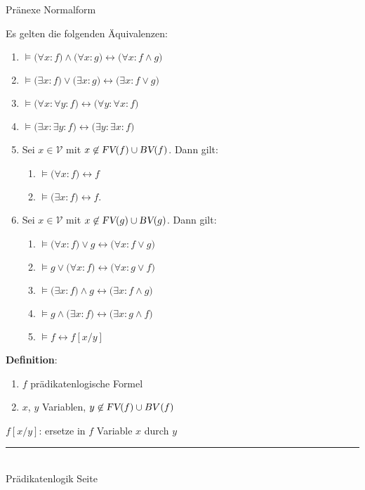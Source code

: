 \documentclass{slides}
\newcommand{\myrule}{\rule{20cm}{1mm}\\ }
\newcommand{\FV}{\textsl{FV}}
\newcommand{\BV}{\textsl{BV}}
\newcounter{mypage}
\begin{document}

\begin{slide}{}
\normalsize
\begin{center}
Pränexe Normalform
\end{center}
\vspace{0.5cm}

\footnotesize
Es gelten die folgenden Äquivalenzen:
  \begin{enumerate}
  \item $\models \big(\forall x\colon f\big) \wedge \big(\forall x\colon g\big) \leftrightarrow \big(\forall x\colon f \wedge g\big)$
  \item $\models \big(\exists x\colon f\big) \vee \big(\exists x\colon g\big) \leftrightarrow \big(\exists x\colon f \vee g\big)$
  \item $\models \big(\forall x\colon \forall y\colon f \big) \leftrightarrow \big(\forall y\colon  \forall x\colon f \big)$
  \item $\models \big(\exists x\colon \exists y\colon f \big) \leftrightarrow \big(\exists y\colon  \exists x\colon f \big)$
  \item Sei $x \in \mathcal{V}$ mit $x \not\in \FV(f) \cup \BV(f)$. Dann gilt:
    \begin{enumerate}
    \item $\models  \big(\forall x\colon f) \leftrightarrow f$ 
    \item $\models  \big(\exists x\colon f) \leftrightarrow f$.
    \end{enumerate}
  \item Sei $x \in \mathcal{V}$ mit $x \not\in \FV(g) \cup \BV(g)$. Dann gilt:
    \begin{enumerate}
    \item $\models \big(\forall x\colon f) \vee g \leftrightarrow \big(\forall x\colon f \vee g\big)$
    \item $\models g \vee \big(\forall x\colon f) \leftrightarrow \big(\forall x\colon g \vee f\big)$
    \item $\models \big(\exists x\colon f) \wedge g \leftrightarrow \big(\exists x\colon f \wedge g\big)$
    \item $\models g \wedge \big(\exists x\colon f) \leftrightarrow \big(\exists x\colon g \wedge f\big)$
    \item $\models f \leftrightarrow f[x/y]$
    \end{enumerate}
  \end{enumerate}

\textbf{Definition}: 
\begin{enumerate}
\item  $f$  prädikatenlogische Formel
\item $x$, $y$ Variablen, $y \not\in \FV(f) \cup BV(f)$
\end{enumerate} 
\qquad  $f[x/y]$: ersetze in $f$ Variable  $x$ durch $y$ 


\vspace*{\fill}
\tiny \addtocounter{mypage}{1}
\myrule
Prädikatenlogik   \hspace*{\fill} Seite 
\end{slide}
\end{document}
